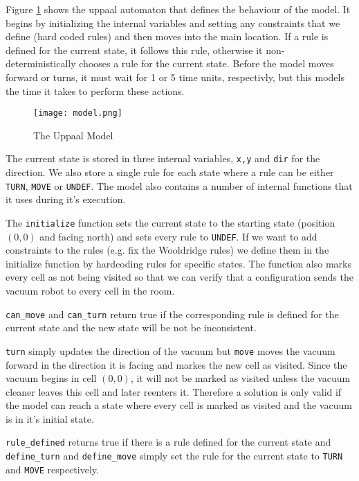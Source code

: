 \documentclass{article}
\begin{document}
    Figure \ref{fig:model} shows the uppaal automaton that defines the behaviour of the model. It begins by initializing the internal variables and setting any constraints that we define (hard coded rules) and then moves into the main location. If a rule is defined for the current state, it follows this rule, otherwise it non-deterministically chooses a rule for the current state. Before the model moves forward or turns, it must wait for 1 or 5 time units, respectivly, but this models the time it takes to perform these actions.

    \begin{figure}[h!]
        \caption{The Uppaal Model}
        \centering
        \texttt{[image: model.png]}
        \label{fig:model}
    \end{figure}

    The current state is stored in three internal variables, \texttt{x,y} and \texttt{dir} for the direction. We also store a single rule for each state where a rule can be either \texttt{TURN}, \texttt{MOVE} or \texttt{UNDEF}. The model also contains a number of internal functions that it uses during it's execution.
    
    The \texttt{initialize} function sets the current state to the starting state (position $(0,0)$ and facing north) and sets every rule to \texttt{UNDEF}. If we want to add constraints to the rules (e.g. fix the  Wooldridge rules) we define them in the initialize function by hardcoding rules for specific states. The function also marks every cell as not being visited so that we can verify that a configuration sends the vacuum robot to every cell in the room.

    \texttt{can\_move} and \texttt{can\_turn} return true if the corresponding rule is defined for the current state  and the new state will be not be inconsistent.

    \texttt{turn} simply updates the direction of the vacuum but \texttt{move} moves the vacuum forward in the direction it is facing and markes the new cell as visited. Since the vacuum begins in cell $(0,0)$, it will not be marked as visited unless the vacuum cleaner leaves this cell and later reenters it. Therefore a solution is only valid if the model can reach a state where every cell is marked as visited and the vacuum is in it's initial state.

    \texttt{rule\_defined} returns true if there is a rule defined for the current state and \texttt{define\_turn} and \texttt{define\_move} simply set the rule for the current state to \texttt{TURN} and \texttt{MOVE} respectively.
\end{document}
